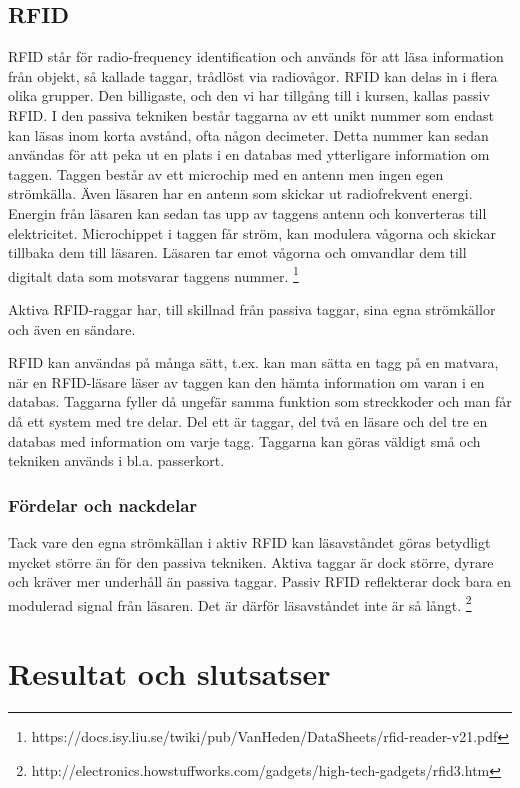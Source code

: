 \documentclass[a4paper,12pt,fleqn]{article}
\begin{document}
\subsection{RFID}
RFID står för radio-frequency identification och används för att läsa information från objekt, så kallade taggar, trådlöst via radiovågor. RFID kan delas in i flera olika grupper. Den billigaste, och den vi har tillgång till i kursen, kallas passiv RFID. I den passiva tekniken består taggarna av ett unikt nummer som endast kan läsas inom korta avstånd, ofta någon decimeter. Detta nummer kan sedan användas för att peka ut en plats i en databas med ytterligare information om taggen. Taggen består av ett microchip med en antenn men ingen egen strömkälla. Även läsaren har en antenn som skickar ut radiofrekvent energi. Energin från läsaren kan sedan tas upp av taggens antenn och konverteras till elektricitet. Microchippet i taggen får ström, kan modulera vågorna och skickar tillbaka dem till läsaren. Läsaren tar emot vågorna och omvandlar dem till digitalt data som motsvarar taggens nummer.
\footnote{https://docs.isy.liu.se/twiki/pub/VanHeden/DataSheets/rfid-reader-v21.pdf}

Aktiva RFID-raggar har, till skillnad från passiva taggar, sina egna strömkällor och även en sändare.

RFID kan användas på många sätt, t.ex. kan man sätta en tagg på en matvara, när en RFID-läsare läser av taggen kan den hämta information om varan i en databas. Taggarna fyller då ungefär samma funktion som streckkoder och man får då ett system med tre delar. Del ett är taggar, del två en läsare och del tre en databas med information om varje tagg. Taggarna kan göras väldigt små och tekniken används i bl.a. passerkort.

\subsubsection{Fördelar och nackdelar}
Tack vare den egna strömkällan i aktiv RFID kan läsavståndet göras betydligt mycket större än för den passiva tekniken. Aktiva taggar är dock större, dyrare och kräver mer underhåll än passiva taggar. Passiv RFID reflekterar dock bara en modulerad signal från läsaren. Det är därför läsavståndet inte är så långt.
\footnote{http://electronics.howstuffworks.com/gadgets/high-tech-gadgets/rfid3.htm}


\section{Resultat och slutsatser}
\end{document}
